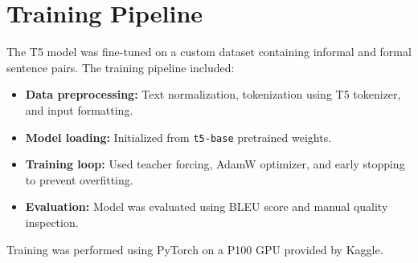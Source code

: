 \section{Training Pipeline}
The T5 model was fine-tuned on a custom dataset containing informal and formal sentence pairs. The training pipeline included:

\begin{itemize}
  \item \textbf{Data preprocessing:} Text normalization, tokenization using T5 tokenizer, and input formatting.
  \item \textbf{Model loading:} Initialized from \texttt{t5-base} pretrained weights.
  \item \textbf{Training loop:} Used teacher forcing, AdamW optimizer, and early stopping to prevent overfitting.
  \item \textbf{Evaluation:} Model was evaluated using BLEU score and manual quality inspection.
\end{itemize}

Training was performed using PyTorch on a P100 GPU provided by Kaggle.